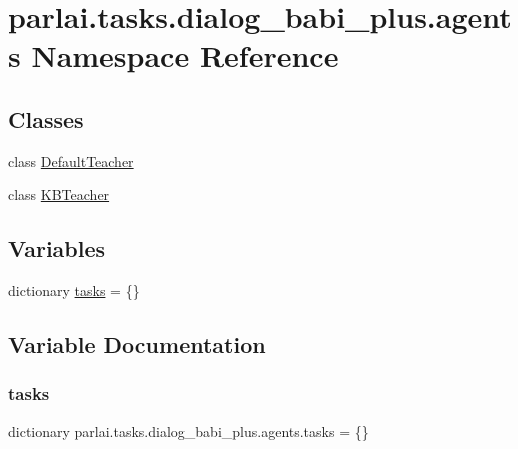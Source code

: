 \hypertarget{namespaceparlai_1_1tasks_1_1dialog__babi__plus_1_1agents}{}\section{parlai.\+tasks.\+dialog\+\_\+babi\+\_\+plus.\+agents Namespace Reference}
\label{namespaceparlai_1_1tasks_1_1dialog__babi__plus_1_1agents}
\subsection*{Classes}
\begin{DoxyCompactItemize}
\item 
class \hyperlink{classparlai_1_1tasks_1_1dialog__babi__plus_1_1agents_1_1DefaultTeacher}{Default\+Teacher}
\item 
class \hyperlink{classparlai_1_1tasks_1_1dialog__babi__plus_1_1agents_1_1KBTeacher}{K\+B\+Teacher}
\end{DoxyCompactItemize}
\subsection*{Variables}
\begin{DoxyCompactItemize}
\item 
dictionary \hyperlink{namespaceparlai_1_1tasks_1_1dialog__babi__plus_1_1agents_ac5c942c6388285b795a5006935acdb73}{tasks} = \{\}
\end{DoxyCompactItemize}


\subsection{Variable Documentation}
\mbox{\label{namespaceparlai_1_1tasks_1_1dialog__babi__plus_1_1agents_ac5c942c6388285b795a5006935acdb73}} 
\subsubsection{\texorpdfstring{tasks}{tasks}}
{\footnotesize\ttfamily dictionary parlai.\+tasks.\+dialog\+\_\+babi\+\_\+plus.\+agents.\+tasks = \{\}}

